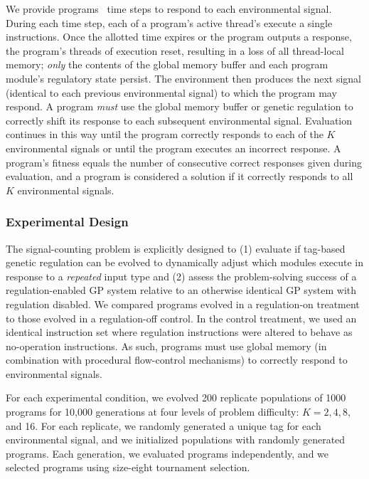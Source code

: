 
We provide programs \RepeatSigTaskCpuTimePerSignal\ time steps to respond to each environmental signal.
During each time step, each of a program's active thread's execute a single instructions.
Once the allotted time expires or the program outputs a response, the program's threads of execution reset, resulting in a loss of all thread-local memory; \textit{only} the contents of the global memory buffer and each program module's regulatory state persist.
The environment then produces the next signal (identical to each previous environmental signal) to which the program may respond.
A program \textit{must} use the global memory buffer or genetic regulation to correctly shift its response to each subsequent environmental signal. 
Evaluation continues in this way until the program correctly responds to each of the $K$ environmental signals or until the program executes an incorrect response.
A program's fitness equals the number of consecutive correct responses given during evaluation, and a program is considered a solution if it correctly responds to all $K$ environmental signals.


\subsubsection{Experimental Design}

The signal-counting problem is explicitly designed to 
(1) evaluate if tag-based genetic regulation can be evolved to dynamically adjust which modules execute in response to a \textit{repeated} input type 
and (2) assess the problem-solving success of a regulation-enabled GP system relative to an otherwise identical GP system with regulation disabled. 
We compared programs evolved in a regulation-on treatment to those evolved in a regulation-off control.
In the control treatment, we used an identical instruction set where regulation instructions were altered to behave as no-operation instructions.  As such, programs must use global memory (in combination with procedural flow-control mechanisms) to correctly respond to environmental signals.

For each experimental condition, we evolved 200 replicate populations of 1000 programs for 10,000 generations at four levels of problem difficulty: $K=2, 4, 8$, and 16.
For each replicate, we randomly generated a unique tag for each environmental signal, and we initialized populations with randomly generated programs.
Each generation, we evaluated programs independently, and we selected programs using size-eight tournament selection.

